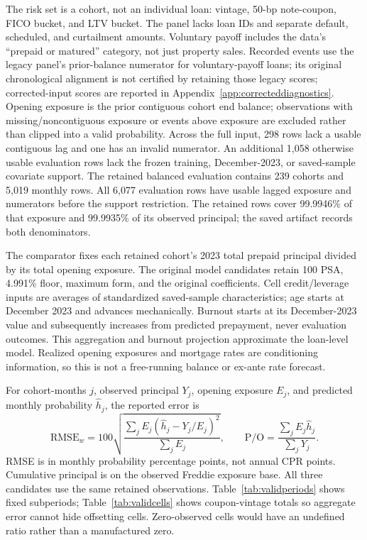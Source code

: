 The risk set is a cohort, not an individual loan: vintage, 50-bp note-coupon, FICO bucket, and LTV bucket. The panel lacks loan IDs and separate default, scheduled, and curtailment amounts. Voluntary payoff includes the data's ``prepaid or matured'' category, not just property sales. Recorded events use the legacy panel's prior-balance numerator for voluntary-payoff loans; its original chronological alignment is not certified by retaining those legacy scores; corrected-input scores are reported in Appendix~\ref{app:correcteddiagnostics}. Opening exposure is the prior contiguous cohort end balance; observations with missing/noncontiguous exposure or events above exposure are excluded rather than clipped into a valid probability. Across the full input, 298 rows lack a usable contiguous lag and one has an invalid numerator. An additional 1,058 otherwise usable evaluation rows lack the frozen training, December-2023, or saved-sample covariate support. The retained balanced evaluation contains 239 cohorts and 5,019 monthly rows. All 6,077 evaluation rows have usable lagged exposure and numerators before the support restriction. The retained rows cover 99.9946\% of that exposure and 99.9935\% of its observed principal; the saved artifact records both denominators.

The comparator fixes each retained cohort's 2023 total prepaid principal divided by its total opening exposure. The original model candidates retain 100 PSA, 4.991\% floor, maximum form, and the original coefficients. Cell credit/leverage inputs are averages of standardized saved-sample characteristics; age starts at December 2023 and advances mechanically. Burnout starts at its December-2023 value and subsequently increases from predicted prepayment, never evaluation outcomes. This aggregation and burnout projection approximate the loan-level model. Realized opening exposures and mortgage rates are conditioning information, so this is not a free-running balance or ex-ante rate forecast.

For cohort-months $j$, observed principal $Y_j$, opening exposure $E_j$, and predicted monthly probability $\widehat h_j$, the reported error is
\begin{equation}
\mathrm{RMSE}_w=100\sqrt{\frac{\sum_j E_j(\widehat h_j-Y_j/E_j)^2}{\sum_j E_j}},\qquad
\mathrm{P/O}=\frac{\sum_j E_j\widehat h_j}{\sum_jY_j}.
\label{eq:validation}
\end{equation}
RMSE is in monthly probability percentage points, not annual CPR points. Cumulative principal is on the observed Freddie exposure base. All three candidates use the same retained observations. Table~\ref{tab:validperiods} shows fixed subperiods; Table~\ref{tab:validcells} shows coupon-vintage totals so aggregate error cannot hide offsetting cells. Zero-observed cells would have an undefined ratio rather than a manufactured zero.

